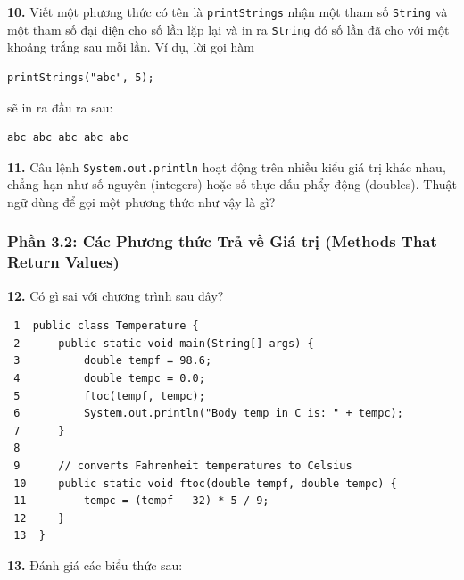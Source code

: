 \textbf{10.} Viết một phương thức có tên là \texttt{printStrings} nhận
một tham số \texttt{String} và một tham số đại diện cho số lần lặp lại
và in ra \texttt{String} đó số lần đã cho với một khoảng trắng sau mỗi
lần. Ví dụ, lời gọi hàm

\begin{verbatim}
printStrings("abc", 5);
\end{verbatim}

sẽ in ra đầu ra sau:

\begin{verbatim}
abc abc abc abc abc
\end{verbatim}

\textbf{11.} Câu lệnh \texttt{System.out.println} hoạt động trên nhiều
kiểu giá trị khác nhau, chẳng hạn như số nguyên (integers) hoặc số thực
dấu phẩy động (doubles). Thuật ngữ dùng để gọi một phương thức như vậy
là gì?

\subsubsection{Phần 3.2: Các Phương thức Trả về Giá trị (Methods That
Return
Values)}\label{phux1ea7n-3.2-cuxe1c-phux1b0ux1a1ng-thux1ee9c-trux1ea3-vux1ec1-giuxe1-trux1ecb-methods-that-return-values}

\textbf{12.} Có gì sai với chương trình sau đây?

\begin{verbatim}
 1  public class Temperature {
 2      public static void main(String[] args) {
 3          double tempf = 98.6;
 4          double tempc = 0.0;
 5          ftoc(tempf, tempc);
 6          System.out.println("Body temp in C is: " + tempc);
 7      }
 8
 9      // converts Fahrenheit temperatures to Celsius
 10     public static void ftoc(double tempf, double tempc) {
 11         tempc = (tempf - 32) * 5 / 9;
 12     }
 13  }
\end{verbatim}

\textbf{13.} Đánh giá các biểu thức sau:

